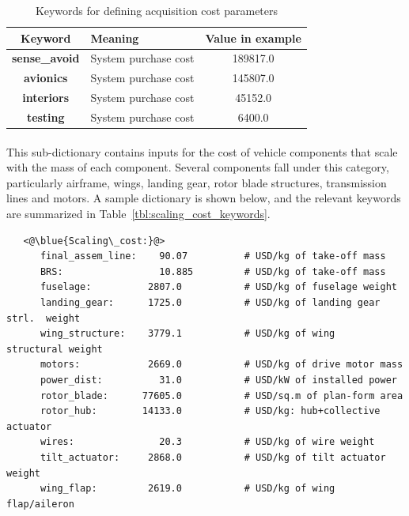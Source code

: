 \begin{table}[h]
\begin{center}
	\caption{Keywords for defining acquisition cost parameters}
	\label{tbl:acq_cost_keywords}
    \begin{tabular}{| c | l | c |}
    \hline
    Keyword & Meaning & Value in example \\ 
    \hline
\textbf{sense\_avoid} & System purchase cost&  189817.0 \\
\textbf{avionics} & System purchase cost &  145807.0 \\
\textbf{interiors} & System purchase cost &  45152.0 \\
\textbf{testing} & System purchase cost &  6400.0 \\
     \hline
  \end{tabular}
\end{center}
\end{table}

\paragraph{}
This sub-dictionary contains inputs for the cost of vehicle components that scale with the mass of each component. Several components fall under this category, particularly airframe, wings, landing gear, rotor blade structures, transmission lines and motors. A sample dictionary is shown below, and the relevant keywords are summarized in Table~\ref{tbl:scaling_cost_keywords}.

\begin{lstlisting}
   <@\blue{Scaling\_cost:}@>
      final_assem_line:    90.07          # USD/kg of take-off mass 
      BRS:                 10.885         # USD/kg of take-off mass 
      fuselage:          2807.0           # USD/kg of fuselage weight
      landing_gear:      1725.0           # USD/kg of landing gear strl.  weight
      wing_structure:    3779.1           # USD/kg of wing     structural weight
      motors:            2669.0           # USD/kg of drive motor mass 
      power_dist:          31.0           # USD/kW of installed power
      rotor_blade:      77605.0           # USD/sq.m of plan-form area
      rotor_hub:        14133.0           # USD/kg: hub+collective actuator
      wires:               20.3           # USD/kg of wire weight 
      tilt_actuator:     2868.0           # USD/kg of tilt actuator weight 
      wing_flap:         2619.0           # USD/kg of wing flap/aileron    
\end{lstlisting}

